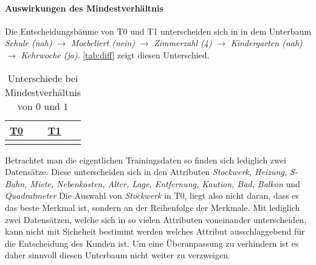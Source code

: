 \paragraph{Auswirkungen des Mindestverhältnis}
Die Entscheidungsbäume von T0 und T1 unterscheiden sich in in dem Unterbaum
\emph{Schule (nah)} $\rightarrow$ \emph{Moebeliert (nein)} $\rightarrow$ \emph{Zimmerzahl (4)} $\rightarrow$ \emph{Kindergarten (nah)} $\rightarrow$ \emph{Kehrwoche (ja)}.
\autoref{tab:diff} zeigt diesen Unterschied.

\useunder{\uline}{\ul}{}
\begin{table}[h]
    \begin{center}
        \begin{tabular}{|p{6cm}|p{6cm}|}
        \hline
            {\ul \textbf{T0}}   & {\ul \textbf{T1}} \\
            \hline
            {}
            &
            {}
            \\
            \hline
        \end{tabular}
        \caption{Unterschiede bei Mindestverhältnis von $0$ und $1$}
        \label{tab:diff}
    \end{center}
\end{table}

Betrachtet man die eigentlichen Trainingsdaten so finden sich lediglich zwei Datensätze.
Diese unterscheiden sich in den Attributen \emph{Stockwerk, Heizung, S-Bahn, Miete, Nebenkosten, Alter, Lage, Entfernung, Kaution, Bad, Balkon} und \emph{Quadratmeter}
Die Auswahl von \emph{Stockwerk} in T0, liegt also nicht daran,
dass es das beste Merkmal ist, sondern an der Reihenfolge der Merkmale.
Mit lediglich zwei Datensätzen, welche sich in so vielen Attributen voneinander unterscheiden,
kann nicht mit Sicheheit bestimmt werden welches Attribut ausschlaggebend für die Entscheidung des Kunden ist.
Um eine Überanpassung zu verhindern ist es daher sinnvoll diesen Unterbaum nicht weiter zu verzweigen.

